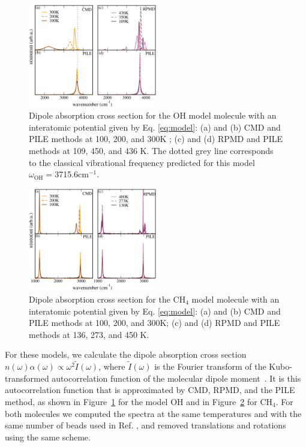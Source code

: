 \documentclass[aps,prb,superscriptaddress,amsmath,amssymb,showpacs,twocolumn]{revtex4}
\begin{document}
\begin{figure}[htbp]
\centering
\includegraphics[width=0.5\textwidth]{figures/comparison_oh_factors.pdf}
\caption{Dipole absorption cross section for the OH model molecule with an interatomic potential given by Eq. \ref{eq:model}: (a) and (b) CMD and PILE methods at 100, 200, and 300K ; (c)  and (d) RPMD and PILE methods at 109, 450, and 436 K. The dotted grey line corresponds to the classical vibrational frequency predicted for this model $\omega_\text{OH}=$3715.6cm$^{-1}$.}
\label{fig:oh-rpmd-cmd-pile}
\end{figure}

\begin{figure}[htbp]
\centering
\includegraphics[width=0.5\textwidth]{figures/comparison_ch4_factors.pdf}
\caption{Dipole absorption cross section for the CH$_4$ model molecule with an interatomic potential given by Eq. \ref{eq:model}: (a) and (b) CMD and PILE methods at 100, 200, and 300K; (c) and (d) RPMD and PILE methods at 136, 273, and 450 K.}
\label{fig:ch4-rpmd-cmd-pile}
\end{figure}

For these models, we calculate the dipole absorption cross section $n(\omega)\alpha(\omega)\propto \omega^2  \tilde{I}(\omega)$, 
where $\tilde{I}(\omega)$ is the Fourier transform of the Kubo-transformed autocorrelation function of the molecular dipole 
moment~\cite{habe+08jcp}. It is this autocorrelation function that is approximated by CMD, RPMD, and the PILE method,
as shown in Figure~\ref{fig:oh-rpmd-cmd-pile} for the model OH and in Figure~\ref{fig:ch4-rpmd-cmd-pile}
for CH$_4$. For  both molecules we computed the spectra at the same temperatures and 
with the same number of beads used in Ref. \cite{witt+09jcp},
and removed translations and rotations using the same scheme. 
\end{document}
